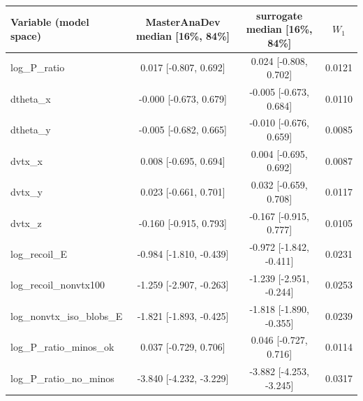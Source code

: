 \begin{tabular}{lccc}
\toprule
Variable (model space) & MasterAnaDev median [16\%, 84\%] & surrogate median [16\%, 84\%] & $W_1$ \\
\midrule
log\_P\_ratio & 0.017 [-0.807, 0.692] & 0.024 [-0.808, 0.702] & 0.0121 \\
dtheta\_x & -0.000 [-0.673, 0.679] & -0.005 [-0.673, 0.684] & 0.0110 \\
dtheta\_y & -0.005 [-0.682, 0.665] & -0.010 [-0.676, 0.659] & 0.0085 \\
dvtx\_x & 0.008 [-0.695, 0.694] & 0.004 [-0.695, 0.692] & 0.0087 \\
dvtx\_y & 0.023 [-0.661, 0.701] & 0.032 [-0.659, 0.708] & 0.0117 \\
dvtx\_z & -0.160 [-0.915, 0.793] & -0.167 [-0.915, 0.777] & 0.0105 \\
log\_recoil\_E & -0.984 [-1.810, -0.439] & -0.972 [-1.842, -0.411] & 0.0231 \\
log\_recoil\_nonvtx100 & -1.259 [-2.907, -0.263] & -1.239 [-2.951, -0.244] & 0.0253 \\
log\_nonvtx\_iso\_blobs\_E & -1.821 [-1.893, -0.425] & -1.818 [-1.890, -0.355] & 0.0239 \\
log\_P\_ratio\_minos\_ok & 0.037 [-0.729, 0.706] & 0.046 [-0.727, 0.716] & 0.0114 \\
log\_P\_ratio\_no\_minos & -3.840 [-4.232, -3.229] & -3.882 [-4.253, -3.245] & 0.0317 \\
\bottomrule
\end{tabular}
